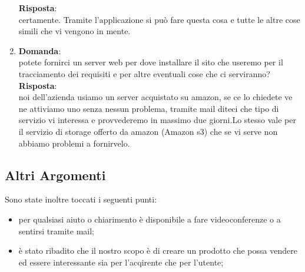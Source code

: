 \documentclass[a4paper,titlepage]{article}
\begin{document}
\begin{enumerate}
  \textbf{Risposta}: \\ 
  certamente. Tramite l'applicazione si può fare questa cosa e tutte le altre cose simili che vi vengono in mente.
  \item \textbf{Domanda}:\\
  potete fornirci un server web per dove installare il sito che useremo per il tracciamento dei requisiti e per altre eventuali cose che ci serviranno?\\
  \textbf{Risposta}: \\
  noi dell'azienda usiamo un server acquistato su amazon, se ce lo chiedete ve ne attiviamo uno senza nessun problema, tramite mail diteci che tipo di servizio vi interessa e provvederemo in massimo due giorni.Lo stesso vale per il servizio di storage offerto da amazon (Amazon s3) che se vi serve non abbiamo problemi a fornirvelo.
\end{enumerate}

\subsection{Altri Argomenti}
\label{sub:AltriArgomenti}

Sono state inoltre toccati i seguenti punti:

\begin{itemize}
  \item per qualsiasi aiuto o chiarimento \PROPONENTE è disponibile a fare videoconferenze o a sentirsi tramite mail;
  \item è stato ribadito che il nostro scopo è di creare un prodotto che possa vendere ed essere interessante sia per l'acqirente che per l'utente;
\end{itemize}
\end{document}
